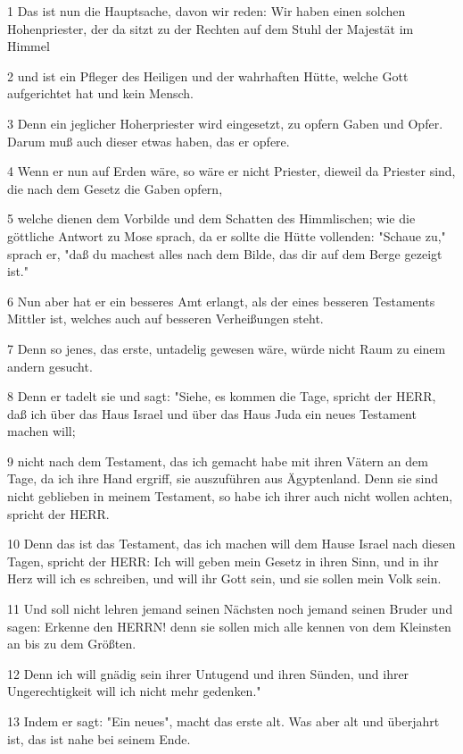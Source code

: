 \par 1 Das ist nun die Hauptsache, davon wir reden: Wir haben einen solchen Hohenpriester, der da sitzt zu der Rechten auf dem Stuhl der Majestät im Himmel
\par 2 und ist ein Pfleger des Heiligen und der wahrhaften Hütte, welche Gott aufgerichtet hat und kein Mensch.
\par 3 Denn ein jeglicher Hoherpriester wird eingesetzt, zu opfern Gaben und Opfer. Darum muß auch dieser etwas haben, das er opfere.
\par 4 Wenn er nun auf Erden wäre, so wäre er nicht Priester, dieweil da Priester sind, die nach dem Gesetz die Gaben opfern,
\par 5 welche dienen dem Vorbilde und dem Schatten des Himmlischen; wie die göttliche Antwort zu Mose sprach, da er sollte die Hütte vollenden: "Schaue zu," sprach er, "daß du machest alles nach dem Bilde, das dir auf dem Berge gezeigt ist."
\par 6 Nun aber hat er ein besseres Amt erlangt, als der eines besseren Testaments Mittler ist, welches auch auf besseren Verheißungen steht.
\par 7 Denn so jenes, das erste, untadelig gewesen wäre, würde nicht Raum zu einem andern gesucht.
\par 8 Denn er tadelt sie und sagt: "Siehe, es kommen die Tage, spricht der HERR, daß ich über das Haus Israel und über das Haus Juda ein neues Testament machen will;
\par 9 nicht nach dem Testament, das ich gemacht habe mit ihren Vätern an dem Tage, da ich ihre Hand ergriff, sie auszuführen aus Ägyptenland. Denn sie sind nicht geblieben in meinem Testament, so habe ich ihrer auch nicht wollen achten, spricht der HERR.
\par 10 Denn das ist das Testament, das ich machen will dem Hause Israel nach diesen Tagen, spricht der HERR: Ich will geben mein Gesetz in ihren Sinn, und in ihr Herz will ich es schreiben, und will ihr Gott sein, und sie sollen mein Volk sein.
\par 11 Und soll nicht lehren jemand seinen Nächsten noch jemand seinen Bruder und sagen: Erkenne den HERRN! denn sie sollen mich alle kennen von dem Kleinsten an bis zu dem Größten.
\par 12 Denn ich will gnädig sein ihrer Untugend und ihren Sünden, und ihrer Ungerechtigkeit will ich nicht mehr gedenken."
\par 13 Indem er sagt: "Ein neues", macht das erste alt. Was aber alt und überjahrt ist, das ist nahe bei seinem Ende.

